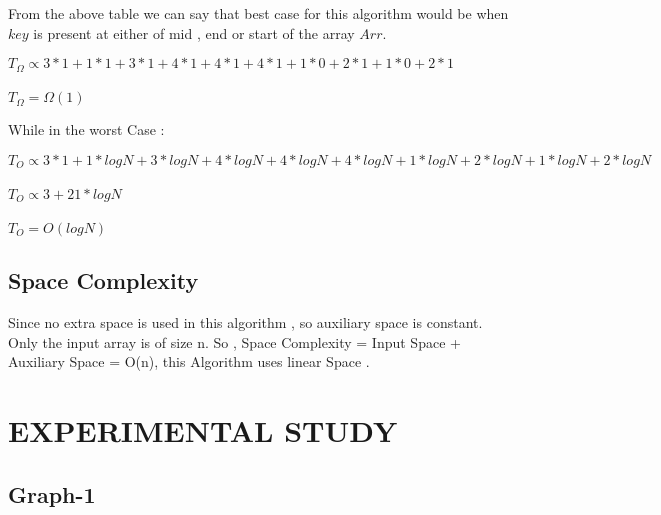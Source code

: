 \documentclass[conference]{IEEEtran}
\begin{document}
From the above table we can say that best case for this algorithm would be when \(key\) is present at either of mid , end or start of the array \(Arr\).

$T_{\Omega} \propto 3 \ast 1 + 1 \ast 1 +3 \ast 1 + 4 \ast 1 + 4 \ast 1 + 4 \ast 1 + 1 \ast 0 + 2 \ast 1 +  1 \ast 0 + 2 \ast 1 $\\\\
$T_{\Omega} = \Omega(1)$

While in the worst Case : 
 
 $T_{O} \propto 3 \ast 1 + 1 \ast logN +3 \ast logN + 4 \ast logN + 4 \ast logN + 4 \ast logN + 1 \ast logN + 2 \ast logN +  1 \ast logN + 2 \ast logN $\\\\
 $T_{O} \propto 3 + 21 \ast logN$\\\\
 $T_{O} = O( logN )$
 
\subsection{Space Complexity}
Since no extra space is used in this algorithm , so auxiliary space is constant.
Only the input array is of size n. So , Space Complexity = Input Space + Auxiliary Space  = O(n), this Algorithm uses linear Space .
\section{EXPERIMENTAL STUDY}
\subsection{Graph-1}
\linebreak\linebreak\linebreak\linebreak
\end{document}
